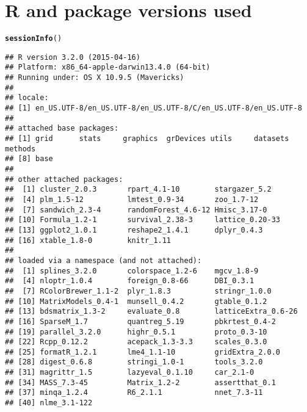 \documentclass[11pt]{article}\usepackage[]{graphicx}\usepackage[]{color}
\makeatletter
\newcommand{\hlstd}[1]{\textcolor[rgb]{0.345,0.345,0.345}{#1}}%
\newcommand{\hlkwd}[1]{\textcolor[rgb]{0.737,0.353,0.396}{\textbf{#1}}}%
\newenvironment{kframe}{%
 \def\at@end@of@kframe{}%
 \ifinner\ifhmode%
  \def\at@end@of@kframe{\end{minipage}}%
  \begin{minipage}{\columnwidth}%
 \fi\fi%
 \def\FrameCommand##1{\hskip\@totalleftmargin \hskip-\fboxsep
 \colorbox{shadecolor}{##1}\hskip-\fboxsep
     \hskip-\linewidth \hskip-\@totalleftmargin \hskip\columnwidth}%
 \MakeFramed {\advance\hsize-\width
   \@totalleftmargin\z@ \linewidth\hsize
   \@setminipage}}%
 {\par\unskip\endMakeFramed%
 \at@end@of@kframe}
\newenvironment{knitrout}{}{} %
\makeatother
\begin{document}
\clearpage


\section{R and package versions used}
\begin{knitrout}
\color{fgcolor}\begin{kframe}
\begin{alltt}
\hlkwd{sessionInfo}\hlstd{()}
\end{alltt}
\begin{verbatim}
## R version 3.2.0 (2015-04-16)
## Platform: x86_64-apple-darwin13.4.0 (64-bit)
## Running under: OS X 10.9.5 (Mavericks)
## 
## locale:
## [1] en_US.UTF-8/en_US.UTF-8/en_US.UTF-8/C/en_US.UTF-8/en_US.UTF-8
## 
## attached base packages:
## [1] grid      stats     graphics  grDevices utils     datasets  methods  
## [8] base     
## 
## other attached packages:
##  [1] cluster_2.0.3       rpart_4.1-10        stargazer_5.2      
##  [4] plm_1.5-12          lmtest_0.9-34       zoo_1.7-12         
##  [7] sandwich_2.3-4      randomForest_4.6-12 Hmisc_3.17-0       
## [10] Formula_1.2-1       survival_2.38-3     lattice_0.20-33    
## [13] ggplot2_1.0.1       reshape2_1.4.1      dplyr_0.4.3        
## [16] xtable_1.8-0        knitr_1.11         
## 
## loaded via a namespace (and not attached):
##  [1] splines_3.2.0       colorspace_1.2-6    mgcv_1.8-9         
##  [4] nloptr_1.0.4        foreign_0.8-66      DBI_0.3.1          
##  [7] RColorBrewer_1.1-2  plyr_1.8.3          stringr_1.0.0      
## [10] MatrixModels_0.4-1  munsell_0.4.2       gtable_0.1.2       
## [13] bdsmatrix_1.3-2     evaluate_0.8        latticeExtra_0.6-26
## [16] SparseM_1.7         quantreg_5.19       pbkrtest_0.4-2     
## [19] parallel_3.2.0      highr_0.5.1         proto_0.3-10       
## [22] Rcpp_0.12.2         acepack_1.3-3.3     scales_0.3.0       
## [25] formatR_1.2.1       lme4_1.1-10         gridExtra_2.0.0    
## [28] digest_0.6.8        stringi_1.0-1       tools_3.2.0        
## [31] magrittr_1.5        lazyeval_0.1.10     car_2.1-0          
## [34] MASS_7.3-45         Matrix_1.2-2        assertthat_0.1     
## [37] minqa_1.2.4         R6_2.1.1            nnet_7.3-11        
## [40] nlme_3.1-122
\end{verbatim}
\end{kframe}
\end{knitrout}
\end{document}
